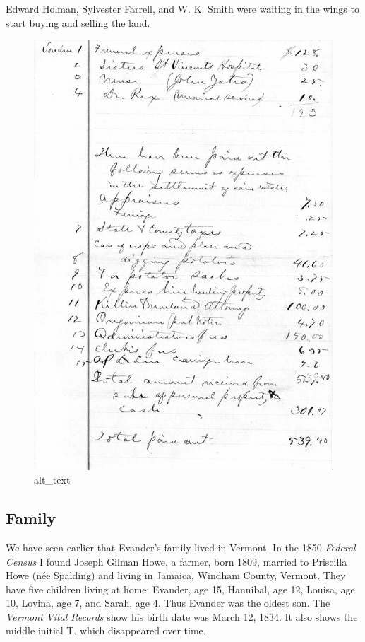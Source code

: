 \documentclass[
  12pt,
]{book}
\begin{document}
Edward Holman, Sylvester Farrell, and W. K. Smith were waiting in the wings to start buying and selling the land.

\begin{figure}
\centering
\includegraphics{images/0201b_images/image3.png}
\caption{alt\_text}
\end{figure}

\hypertarget{family}{%
\subsection{Family}\label{family}}

We have seen earlier that Evander's family lived in Vermont. In the 1850 \emph{Federal Census} I found Joseph Gilman Howe, a farmer, born 1809, married to Priscilla Howe (née Spalding) and living in Jamaica, Windham County, Vermont. They have five children living at home: Evander, age 15, Hannibal, age 12, Louisa, age 10, Lovina, age 7, and Sarah, age 4. Thus Evander was the oldest son. The \emph{Vermont Vital Records} show his birth date was March 12, 1834. It also shows the middle initial T. which disappeared over time.
\end{document}
